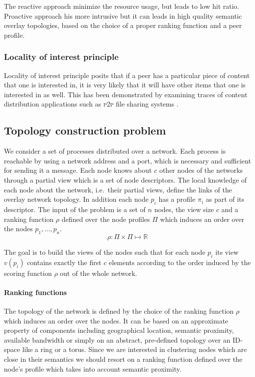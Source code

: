 The reactive approach minimize the resource usage, but leads to low hit ratio. Proactive approach his more intrusive but it can leads in high quality semantic overlay topologies, based on the choice of a proper ranking function and a peer profile.

\subsubsection{Locality of interest principle} Locality of interest principle posits that if a peer has a particular piece of content that one is interested in, it is very likely that it will have other items that one is interested in as well. This has been demonstrated by examining traces of content distribution applications such as \textsc{p2p} file sharing systems \cite{SMZ03}. 

\subsection{\label{subsec:topology_problem}Topology construction problem}
We consider a set of processes distributed over a network. Each process is reachable by using a network address and a port, which is necessary and sufficient for sending it a message. Each node knows about $c$ other nodes of the networks through a partial view which is a set of node descriptors. The local knowledge of each node about the network, i.e.\ their partial views, define the links of the overlay network topology. In addition each node $p_i$ has a profile $\pi_i$ as part of its descriptor. The input of the problem is a set of $n$ nodes, the view size $c$ and a ranking function $\rho$ defined over the node profiles $\Pi$ which induces an order over the nodes $p_1, \ldots, p_n$.
\begin{equation}
 \rho:\Pi \times \Pi \mapsto \mathbb{R}
\label{eq:nodes_ranking_function}
\end{equation}

The goal is to build the views of the nodes such that for each node $p_i$ its view $v(p_i)$ contains exactly the first $c$ elements according to the order induced by the scoring function $\rho$ out of the whole network.

\paragraph{Ranking functions} The topology of the network is defined by the choice of the ranking function $\rho$ which induces an order over the nodes. It can be based on an approximate property of components including geographical location, semantic proximity, available bandwidth or simply on an abstract, pre-defined topology over an ID-space like a ring or a torus. Since we are interested in clustering nodes which are close in their semantics we should resort on a ranking function defined over the node's profile which takes into account semantic proximity.

